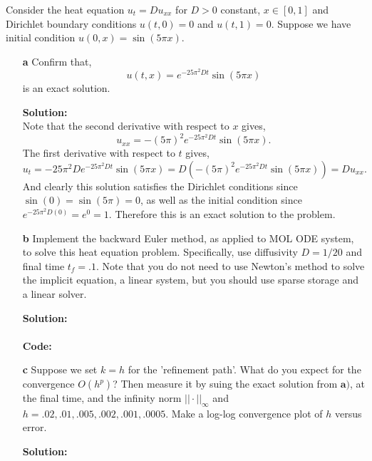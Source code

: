 \documentclass[12pt]{article}
\makeatletter
\theoremstyle{homework}
\newenvironment{exercise}[1]
{\def\@currentlabel{#1}\exercisecore}
{\endexercisecore}
\newcommand{\localhead}[1]{\par\smallskip\noindent\textbf{#1}\nobreak\\}%
\newcommand\solution{\localhead{Solution:}}
\makeatother
\begin{document}
\begin{exercise}{Problem P34} Consider the heat equation $u_t = Du_{xx}$ for $D > 0$ constant, $x \in [0,1]$ and Dirichlet boundary conditions $u(t, 0) = 0$ and $u(t, 1) = 0$. Suppose we have initial condition $u(0, x) = \sin(5\pi x)$. 
  \begin{enumerate}
    \item[\textbf{a}] Confirm that, 
    \begin{equation*}
      u(t, x) = e^{-25\pi^2Dt}\sin(5\pi x)
    \end{equation*}
    is an exact solution. 
    \solution Note that the second derivative with respect to $x$ gives, 
    \begin{equation*}
      u_{xx} = -(5\pi)^2e^{-25\pi^2Dt}\sin(5\pi x).
    \end{equation*}
    The first derivative with respect to $t$ gives, 
    \begin{equation*}
      u_{t} = -25\pi^2De^{-25\pi^2Dt}\sin(5\pi x) =  D(-(5\pi)^2e^{-25\pi^2Dt}\sin(5\pi x)) = Du_{xx}.
    \end{equation*}
    And clearly this solution satisfies the Dirichlet conditions since $\sin(0) = \sin(5\pi) = 0$, as well as the initial condition since $e^{-25\pi^2D(0)} = e^0 = 1$. Therefore this is an exact solution to the problem. 
    \vspace*{.15in}


    \item[\textbf{b}] Implement the backward Euler method, as applied to MOL ODE system, to solve this heat equation problem. Specifically, use diffusivity $D = 1/20$ and final time $t_f = .1$. Note that you do not need to use Newton's method to solve the implicit equation, a linear system, but you should use sparse storage and a linear solver. 
    \solution\\
    \textbf{Code:}
    \begin{center}
      
    \end{center}
    \vspace*{.15in}





    \item[\textbf{c}] Suppose we set $k = h$ for the 'refinement path'. What do you expect for the convergence $O(h^p)$? Then measure it by suing the exact solution from $\textbf{a)}$, at the final time, and the infinity norm $||\cdot||_{\infty}$ and $h = .02, .01, .005, .002, .001, .0005$. Make a log-log convergence plot of $h$ versus error. 
    \solution


\end{enumerate}
\end{exercise}
\end{document}
